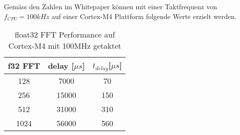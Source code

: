 Gemäss den Zahlen im Whitepaper können mit einer Taktfrequenz von $f_{CPU}=100\si{kHz}$ auf einer Cortex-M4 Plattform folgende Werte erzielt werden.

\begin{table}[H]
	\centering
	\begin{tabular}{|c|c|c|}
		\hline
		\textbf{f32 FFT} & \textbf{delay {[}$\mu s${]}} & \textbf{$t_{delay}${[}$\mu\si{s}${]}} \\ \hline
		128              & 7000                & 70                             \\ \hline
		256              & 15000               & 150                            \\ \hline
		512              & 31000               & 310                            \\ \hline
		1024             & 56000               & 560                            \\ \hline
	\end{tabular}
	\caption{float32 FFT Performance auf Cortex-M4 mit 100MHz getaktet}
	\label{tab:FFT_performance}
\end{table}





